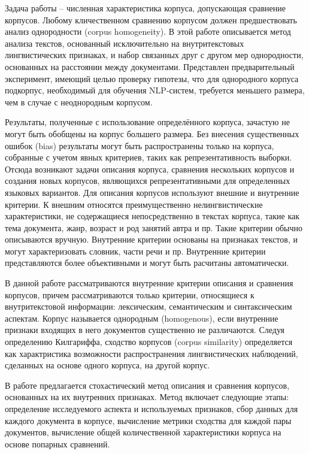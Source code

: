 Задача работы -- численная характеристика корпуса, допускающая сравнение корпусов. Любому кличественном сравнению корпусом должен предшествовать анализ однородности (corpus homogeneity). В этой работе описывается метод анализа текстов, основанный исключительно на внутритекстовых лингвистических признаках, и набор связанных друг с другом мер однородности, основанных на расстоянии между документами. Представлен предварительный эксперимент, имеющий целью проверку гипотезы, что для однородного корпуса подкорпус, необходимый для обучения NLP-систем, требуется меньшего размера, чем в случае с неоднородным корпусом.

Результаты, полученные с использование определённого корпуса, зачастую не могут быть обобщены на корпус большего размера. Без внесения существенных ошибок (bias) результаты могут быть распространены только на корпуса, собранные с учетом явных критериев, таких как репрезентативность выборки. Отсюда возникают задачи описания корпуса, сравнения нескольких корпусов и создания новых корпусов, являющихся репрезентативными для определенных языковых вариантов. Для описания корпусов используют внешние и внутренние критерии. К внешним относятся преимущественно нелингвистические характеристики, не содержащиеся непосредственно в текстах корпуса, такие как тема документа, жанр, возраст и род занятий автра и пр. Такие критерии обычно описываются вручную. Внутренние критерии основаны на признаках текстов, и могут характеризовать словник, части речи и пр. Внутренние критерии представляются более объективными и могут быть расчитаны автоматически. 

В данной работе рассматриваются внутренние критерии описания и сравнения корпусов, причем рассматриваются только критерии, относящиеся к внутритекстовой информации: лексическим, семантическим и синтаксическим аспектам. Корпус называется однородным (homogenous), если внутренние признаки входящих в него документов существенно не различаются. Следуя определению Килгариффа, сходство корпусов (corpus similarity) определяется как характристика возможности распространения лингвистических наблюдений, сделанных на основе одного корпуса, на другой корпус.

В работе предлагается стохастический метод описания и сравнения корпусов, основанных на их внутренних признаках. Метод включает следующие этапы: определение исследуемого аспекта и используемых признаков, сбор данных для каждого документа в корпусе, вычисление метрики сходства для каждой пары документов, вычисление общей количественной характеристики корпуса на основе попарных сравнений.

